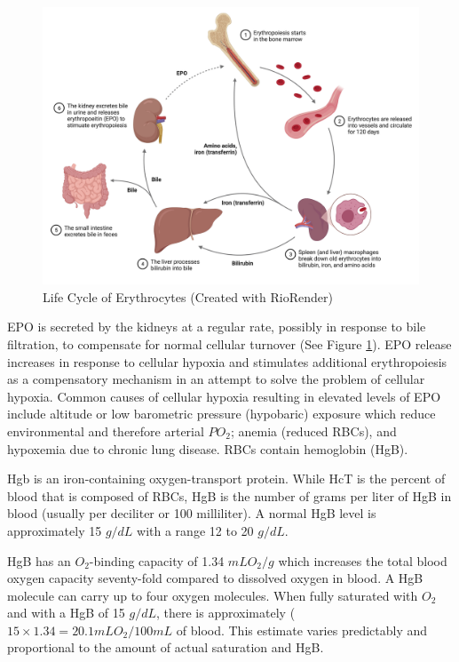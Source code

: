 \begin{figure}[!h]
    \centering
    \includegraphics[width=1.0\linewidth]{./figure/RBC.png}
    \caption{Life Cycle of Erythrocytes \footnotesize{(Created with RioRender)}}
    \label{fig:RBC}
\end{figure}

EPO is secreted by the kidneys at a regular rate, possibly in response to bile filtration, to compensate for normal cellular turnover (See Figure \ref{fig:RBC}). EPO release increases in response to cellular hypoxia and stimulates additional erythropoiesis as a compensatory mechanism in an attempt to solve the problem of cellular hypoxia. Common causes of cellular hypoxia resulting in elevated levels of EPO include altitude or low barometric pressure (hypobaric) exposure which reduce environmental and therefore arterial $PO_2$; anemia (reduced RBCs), and hypoxemia due to chronic lung disease. RBCs contain hemoglobin (HgB). 

Hgb is an iron-containing oxygen-transport protein. While HcT is the percent of blood that is composed of RBCs, HgB is the number of grams per liter of HgB in blood (usually per deciliter or 100 milliliter\footnotemark{}). A normal HgB level is approximately 15 $g/dL$ with a range 12 to 20 $g/dL$.

HgB has an $O_2$-binding capacity of 1.34 $mL O_2 / g$ which increases the total blood oxygen capacity seventy-fold compared to dissolved oxygen in blood. A HgB molecule can carry up to four oxygen molecules. When fully saturated with $O_2$ and with a HgB of 15 $g/dL$, there is approximately ($15 \times 1.34 = 20.1 mL O_2/ 100 mL$ of blood. This estimate varies predictably and proportional to the amount of actual saturation and HgB.

